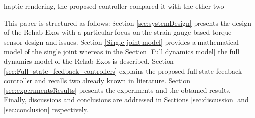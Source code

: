 \DIFaddend haptic rendering, \DIFdelbegin {}\DIFdelend the \DIFaddbegin {}\DIFaddend proposed controller \DIFdelbegin {}\DIFdelend \DIFaddbegin {}\DIFaddend compared it with the other two  \DIFdelbegin {}\DIFdelend \DIFaddbegin {}\DIFaddend 


\DIFaddbegin 

\DIFaddend \par This paper is structured as follows: Section \ref{sec:systemDesign} presents the design of the Rehab-Exos with a particular focus on the strain gauge-based torque sensor design and issues. Section \ref{Single joint model} provides a mathematical model of the single joint whereas in the Section \ref{Full dynamics model} the full dynamics model of the Rehab-Exos is described. Section \ref{sec:Full_state_feedback_controllers} explains the proposed full state feedback controller and recalls two \DIFdelbegin {}\DIFdelend \DIFaddbegin {}\DIFaddend already known in literature. Section \ref{sec:experimentsResults} presents the experiments and the obtained results.
Finally, discussions and conclusions are addressed in Sections \ref{sec:discussion} and \ref{sec:conclusion} respectively.  

